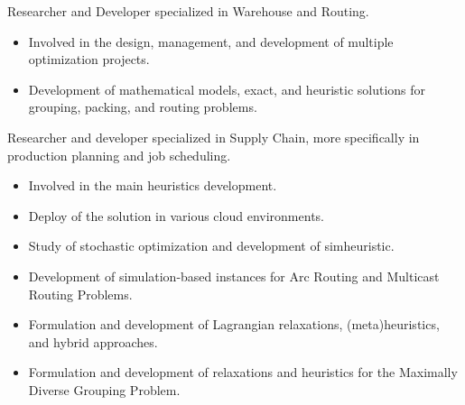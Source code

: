 \documentclass[10pt,a4paper,ragged2e,withhyper]{altacv}
\begin{document}
\begin{paracol}{2}
            {Researcher and Developer specialized in Warehouse and Routing}. \\
            \medskip
            \begin{itemize}
                \item Involved in the design, management, and development of
                  multiple optimization projects.
                \item Development of mathematical models, exact, and heuristic solutions for grouping, packing, and routing problems.
            \end{itemize}
        \divider
            {Researcher and developer specialized in Supply Chain, more specifically in production
              planning and job scheduling}.\\
            \medskip
            \begin{itemize}
                \item Involved in the main heuristics development.
                \item Deploy of the solution in various cloud environments.
            \end{itemize}
	      \begin{itemize}
	            \item Study of stochastic optimization and development of simheuristic.
	            \item Development of simulation-based instances for Arc Routing and Multicast Routing Problems. 
		        \item Formulation and development of Lagrangian relaxations, (meta)heuristics, and hybrid approaches.
		  \end{itemize}
		\divider
		\medskip
        \begin{itemize}
        	\item Formulation and development of relaxations and heuristics for the Maximally Diverse Grouping Problem.

\end{itemize}
\end{paracol}
\end{document}
